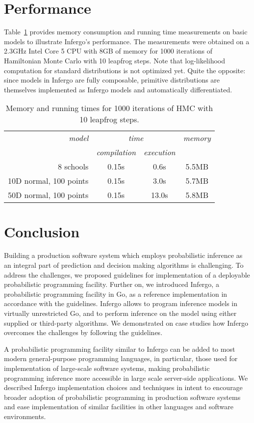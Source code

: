 \documentclass[sigplan,review,10pt,anonymous]{acmart}
\begin{document}
\begin{sloppypar}
\section{Performance}

Table~\ref{tab:memory-runtime} provides memory consumption and
running time measurements on basic models to illustrate
Infergo's performance.  The measurements were obtained on a
2.3GHz Intel Core 5 CPU with 8GB of memory for 1000 iterations
of Hamiltonian Monte Carlo with 10 leapfrog steps. Note that
log-likelihood computation for standard distributions is not
optimized yet. Quite the opposite: since models in Infergo are
fully composable, primitive distributions are themselves
implemented as Infergo models and automatically differentiated.

{\smaller \begin{table}[H] \caption{Memory and running times for
	1000 iterations of HMC with 10 leapfrog steps.}
	\label{tab:memory-runtime} \begin{tabular}{r | c |  c | c}
		{\it model}  & \multicolumn{2}{c|}{\it time} & {\it
		memory} \\ & {\it compilation} & {\it execution} &
		\\\hline 8 schools & 0.15s & 0.6s & 5.5MB \\ 10D normal,
		100 points & 0.15s & 3.0s & 5.7MB \\ 50D normal, 100
		points & 0.15s & 13.0s & 5.8MB \end{tabular}
\end{table}}

\section{Conclusion}

Building a production software system which employs
probabilistic inference as an integral part of prediction and
decision making algorithms is challenging. To address the
challenges, we proposed guidelines for implementation of a
deployable probabilistic programming facility. Further on, we
introduced Infergo, a probabilistic programming facility in Go,
as a reference implementation in accordance with the guidelines.
Infergo allows to program inference models in virtually
unrestricted Go, and to perform inference on the model using
either supplied or third-party algorithms. We demonstrated on
case studies how Infergo overcomes the challenges by following
the guidelines.

A probabilistic programming facility similar to Infergo can be
added to most modern general-purpose programming languages, in
particular, those used for implementation of large-scale
software systems, making probabilistic programming inference
more accessible in large scale server-side applications. We
described Infergo implementation choices and techniques in
intent to encourage broader adoption of probabilistic
programming in production software systems and ease
implementation of similar facilities in other languages and
software environments.


\end{sloppypar}
\end{document}

